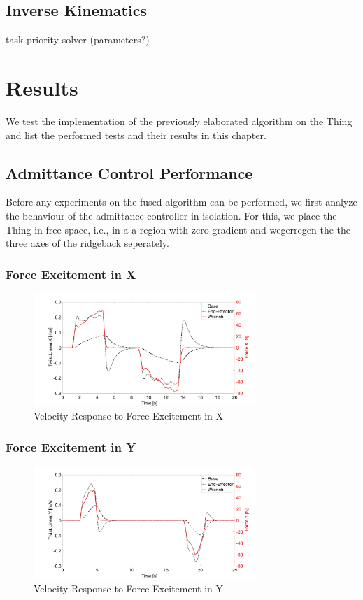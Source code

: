 \section{Inverse Kinematics}
task priority solver (parameters?)
\chapter{Results}
We test the implementation of the previously elaborated algorithm on the Thing and list the performed tests and their results in this chapter.
\section{Admittance Control Performance}
Before any experiments on the fused algorithm can be performed, we first analyze the behaviour of the admittance controller in isolation. For this, we place the Thing in free space, i.e., in a a region with zero gradient and wegerregen the the three axes of the ridgeback seperately.

\subsection{Force Excitement in X}
\begin{figure}
   \centering
   \includegraphics[width=0.75\textwidth]{images/test18_x.jpg}
   \caption{Velocity Response to Force Excitement in X}
   \label{pics:test18_x}
\end{figure}

\subsection{Force Excitement in Y}
\begin{figure}
   \centering
   \includegraphics[width=0.75\textwidth]{images/test18_y.jpg}
   \caption{Velocity Response to Force Excitement in Y}
   \label{pics:test18_y}
\end{figure}
